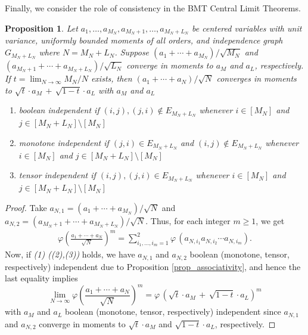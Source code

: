 \documentclass[a4paper,12pt]{extarticle}
\newtheorem{prop}[thm]{Proposition}
\theoremstyle{definition}
\theoremstyle{remark}
\begin{document}
Finally, we consider the role of consistency in the BMT Central Limit Theorems.

\begin{prop}\label{prop_disjoint_conv}
	Let $a_1,\ldots,a_{M_N},a_{M_N+1},\ldots,a_{M_N+L_N}$ be centered variables with unit variance, uniformly bounded moments of all orders, and independence graph $G_{M_N + L_N}$ where $N = M_N +L_N$.  
	Suppose $(a_1 + \cdots + a_{M_N})/\sqrt{M_N}$ and $(a_{M_N+1} + \cdots + a_{M_N+L_N})/\sqrt{L_N}$ converge in moments to $a_M$ and $a_L$, respectively. %
	If $t = \lim_{N \to \infty} M_N / N $ exists, then $(a_1 + \cdots + a_N)/\sqrt{N}$ converges in moments to $\sqrt{t} \cdot a_M \, + \, \sqrt{1-t} \cdot a_L$ with $a_M$ and $a_L$ 
	\begin{enumerate}[(1)]
		\item boolean independent if $(i,j),(j,i) \notin E_{M_N + L_N}$ whenever $i \in [M_N]$ and $j \in [M_N + L_N] \setminus [M_N]$
		\item monotone independent if $(j,i) \in E_{M_N + L_N}$ and $(i,j) \notin E_{M_N + L_N}$ whenever $i \in [M_N]$ and $j \in [M_N + L_N] \setminus [M_N]$
		\item tensor independent if $(i,j),(j,i) \in E_{M_N + L_N}$ whenever $i \in [M_N]$ and $j \in [M_N + L_N] \setminus [M_N]$
	\end{enumerate}
\end{prop}

\begin{proof}
	Take $a_{N,1} = (a_1 + \cdots + a_{M_N})/\sqrt{N}$ and $a_{N,2} = (a_{M_N+1} + \cdots + a_{M_N+L_N})/\sqrt{N}$. 
	Thus, for each integer $m\geq 1$, we get   
	\begin{align*}
		\varphi \left(\frac{a_1 + \cdots + a_N}{\sqrt{N}}\right)^m
		=
		\sum_{i_1,\ldots,i_m=1}^2  \varphi \, ( a_{N,i_1} a_{N,i_2} \cdots  a_{N,i_m} ) . 
	\end{align*}
	Now, if \emph{(1) ((2),(3))} holds, we have $a_{N,1}$ and $a_{N,2}$ boolean (monotone, tensor, respectively) independent due to Proposition \ref{prop_associativity}, and hence the last equality implies 
	\[ 
	\lim_{N \to \infty} \varphi
	\left(\frac{a_1 + \cdots + a_N}{\sqrt{N}}\right)^m
	=
	\varphi \, (\sqrt{t} \cdot a_M \, + \, \sqrt{1-t} \cdot a_L)^m
	\]
	with $a_M$ and $a_L$ boolean (monotone, tensor, respectively) independent since $a_{N,1}$ and $a_{N,2}$ converge in moments to $\sqrt{t} \cdot a_M$ and $\sqrt{1-t} \cdot a_L$, respectively. 
\end{proof}
\end{document}
